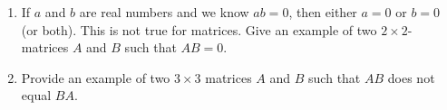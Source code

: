 \documentclass[12pt]{amsart}
\theoremstyle{definition}
\begin{document}
\begin{enumerate}[itemsep=0.8em,leftmargin=0pt]


\item If $a$ and $b$ are real numbers and we know $ab=0$, then either $a=0$ or $b=0$ (or both). This is not true for matrices. Give an example of two $2\times 2$-matrices $A$ and $B$ such that $AB=0$. %


\item Provide an example of two $3\times 3$ matrices $A$ and $B$ such that $AB$ does not equal $BA$.


\end{enumerate}
\end{document}

